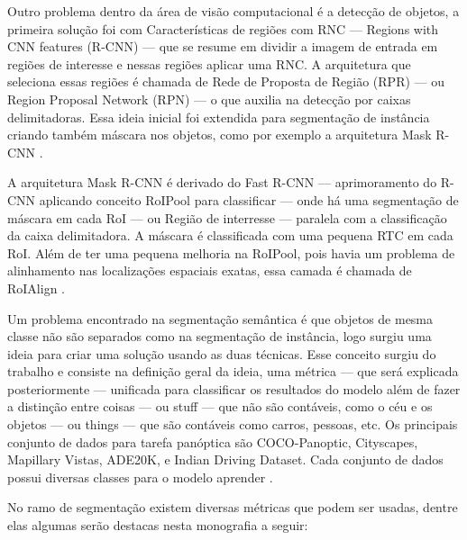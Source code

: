 
Outro problema dentro da área de visão computacional é a detecção de objetos, a primeira solução foi com Características de regiões com RNC — Regions with CNN features (R-CNN) — que se resume em dividir a imagem de entrada em regiões de interesse e nessas regiões aplicar uma RNC. A arquitetura que seleciona essas regiões é chamada de Rede de Proposta de Região (RPR) — ou Region Proposal Network (RPN) — o que auxilia na detecção por caixas delimitadoras. Essa ideia inicial foi extendida para segmentação de instância criando também máscara nos objetos, como por exemplo a arquitetura Mask R-CNN \space\cite{dp_semantic_segmantation, lapix}.

A arquitetura Mask R-CNN é derivado do Fast R-CNN — aprimoramento do R-CNN aplicando conceito RoIPool para classificar — onde há uma segmentação de máscara em cada RoI — ou Região de interresse — paralela com a classificação da caixa delimitadora. A máscara é classificada com uma pequena RTC em cada RoI. Além de ter uma pequena melhoria na RoIPool, pois havia um problema de alinhamento nas localizações espaciais exatas, essa camada é chamada de RoIAlign \space\cite{maskRCNN}.


Um problema encontrado na segmentação semântica é que objetos de mesma classe não são separados como na segmentação de instância, logo surgiu uma ideia para criar uma solução usando as duas técnicas. Esse conceito surgiu do trabalho  e consiste na definição geral da ideia, uma métrica — que será explicada posteriormente — unificada para classificar os resultados do modelo além de fazer a distinção entre coisas — ou stuff — que não são contáveis, como o céu e os objetos — ou things — que são contáveis como carros, pessoas, etc.
Os principais conjunto de dados para tarefa panóptica são COCO-Panoptic, Cityscapes, Mapillary Vistas, ADE20K, e Indian Driving Dataset. Cada conjunto de dados possui diversas classes para o modelo aprender \space\cite{v7labs2022panoptic}.

\label{sec:metricas_tecnicas}

No ramo de segmentação existem diversas métricas que podem ser usadas, dentre elas algumas serão destacas nesta monografia a seguir:

\label{sec:classificacao_conjuntos}

